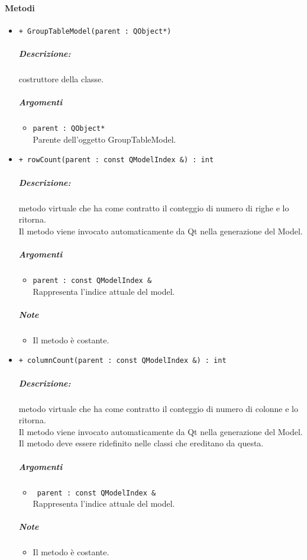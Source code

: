 {\paragraph{\color{black}Metodi\\}
\begin{itemize}
	\item \color{blue}\verb!+ GroupTableModel(parent : QObject*)!\\
		\color{black}
		\subparagraph{Descrizione:} costruttore della classe.\\
		\subparagraph{Argomenti}
			\begin{itemize}
				\item \color{RoyalPurple}\verb!parent : QObject*!\\
				\color{Black}Parente dell'oggetto GroupTableModel.
			\end{itemize}
			
	\item \color{blue}\verb!+ rowCount(parent : const QModelIndex &) : int!\\
	\color{black}
	\subparagraph{Descrizione:} metodo virtuale che ha come contratto il conteggio di numero di righe e lo ritorna.
	\\Il metodo viene invocato automaticamente da Qt\g{} nella generazione del Model.\\
	\subparagraph{Argomenti}
		\begin{itemize}
			\item \color{RoyalPurple}\verb!parent : const QModelIndex &!\\
			\color{Black}Rappresenta l'indice attuale del model.
		\end{itemize}
	\subparagraph{Note}
			\begin{itemize}
				\item Il metodo è costante.
			\end{itemize}
	
	\item \color{blue}\verb!+ columnCount(parent : const QModelIndex &) : int!\\
	\color{black}
	\subparagraph{Descrizione:} metodo virtuale che ha come contratto il conteggio di numero di colonne e lo ritorna.\\
	Il metodo viene invocato automaticamente da Qt\g{} nella generazione del Model.\\
	Il metodo deve essere ridefinito nelle classi che ereditano da questa.\\
	\subparagraph{Argomenti}
		\begin{itemize}
			\item \color{RoyalPurple}\verb! parent : const QModelIndex &!\\
			\color{black}Rappresenta l'indice attuale del model.
		\end{itemize}
	\subparagraph{Note}
			\begin{itemize}
				\item Il metodo è costante.
			\end{itemize}
		

\end{itemize}}
